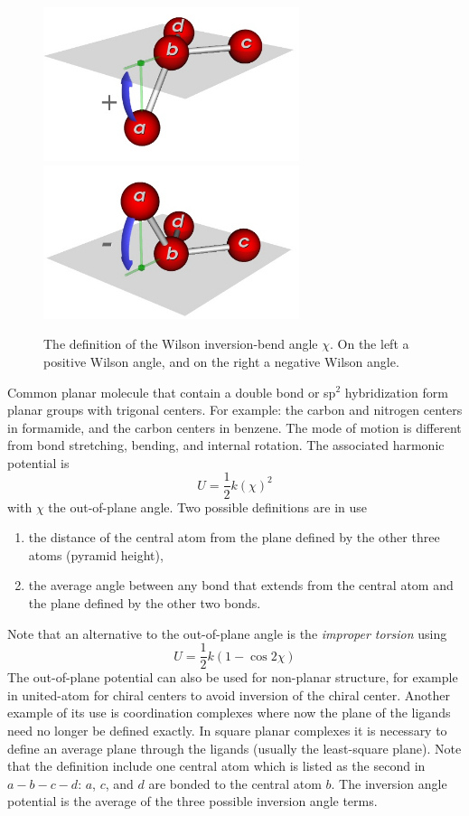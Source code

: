 \begin{figure}[t]
  \centering
  \includegraphics[width=7.5cm]{./Potentials/WilsonAnglePlus.jpg}
  \includegraphics[width=7.5cm]{./Potentials/WilsonAngleMinus.jpg}
  \caption{The definition of the Wilson inversion-bend angle $\chi$.
  On the left a positive Wilson angle, and on the right a negative Wilson angle.}
  \label{Fig: Wilson definition}
\end{figure}

Common planar molecule that contain a double bond or sp$^2$ hybridization form planar groups with trigonal centers.
For example: the carbon and nitrogen centers in formamide, and the carbon centers in benzene.
The mode of motion is different from bond stretching, bending, and internal rotation.
The associated harmonic potential is
\begin{equation}
  U=\frac{1}{2} k \left(\chi\right)^2
\end{equation}
with $\chi$ the out-of-plane angle. Two possible definitions are in use
\begin{enumerate}
\item{the distance of the central atom from the plane defined by the other three atoms (pyramid height),}
\item{the average angle between any bond that extends from the central atom and the plane defined by the
other two bonds}.
\end{enumerate}
Note that an alternative to the out-of-plane angle is the \emph{improper torsion} using
\begin{equation}
  U=\frac{1}{2} k \left(1-\cos 2\chi\right)
\end{equation}
The out-of-plane potential can also be used for non-planar structure, for example in united-atom for chiral
centers to avoid inversion of the chiral center. Another example of its use is coordination complexes
where now the plane of the ligands need no longer be defined exactly.
In square planar complexes it is necessary to define an average plane through the ligands
(usually the least-square plane).
Note that the definition include one central atom
which is listed as the second in $a-b-c-d$: $a$, $c$, and $d$ are bonded to the central atom $b$.
The inversion angle potential is the average of the three possible inversion angle terms.

